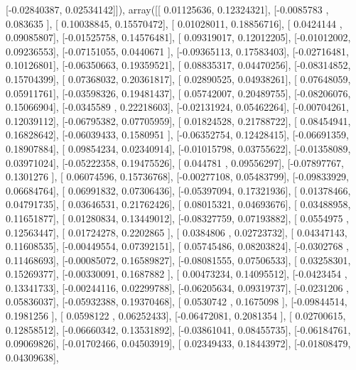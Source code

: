 \documentclass{article}
\begin{document}
       [-0.02840387,  0.02534142]]), array([[ 0.01125636,  0.12324321],
       [-0.0085783 ,  0.083635  ],
       [ 0.10038845,  0.15570472],
       [ 0.01028011,  0.18856716],
       [ 0.0424144 ,  0.09085807],
       [-0.01525758,  0.14576481],
       [ 0.09319017,  0.12012205],
       [-0.01012002,  0.09236553],
       [-0.07151055,  0.0440671 ],
       [-0.09365113,  0.17583403],
       [-0.02716481,  0.10126801],
       [-0.06350663,  0.19359521],
       [ 0.08835317,  0.04470256],
       [-0.08314852,  0.15704399],
       [ 0.07368032,  0.20361817],
       [ 0.02890525,  0.04938261],
       [ 0.07648059,  0.05911761],
       [-0.03598326,  0.19481437],
       [ 0.05742007,  0.20489755],
       [-0.08206076,  0.15066904],
       [-0.0345589 ,  0.22218603],
       [-0.02131924,  0.05462264],
       [-0.00704261,  0.12039112],
       [-0.06795382,  0.07705959],
       [ 0.01824528,  0.21788722],
       [ 0.08454941,  0.16828642],
       [-0.06039433,  0.1580951 ],
       [-0.06352754,  0.12428415],
       [-0.06691359,  0.18907884],
       [ 0.09854234,  0.02340914],
       [-0.01015798,  0.03755622],
       [-0.01358089,  0.03971024],
       [-0.05222358,  0.19475526],
       [ 0.044781  ,  0.09556297],
       [-0.07897767,  0.1301276 ],
       [ 0.06074596,  0.15736768],
       [-0.00277108,  0.05483799],
       [-0.09833929,  0.06684764],
       [ 0.06991832,  0.07306436],
       [-0.05397094,  0.17321936],
       [ 0.01378466,  0.04791735],
       [ 0.03646531,  0.21762426],
       [ 0.08015321,  0.04693676],
       [ 0.03488958,  0.11651877],
       [ 0.01280834,  0.13449012],
       [-0.08327759,  0.07193882],
       [ 0.0554975 ,  0.12563447],
       [ 0.01724278,  0.2202865 ],
       [ 0.0384806 ,  0.02723732],
       [ 0.04347143,  0.11608535],
       [-0.00449554,  0.07392151],
       [ 0.05745486,  0.08203824],
       [-0.0302768 ,  0.11468693],
       [-0.00085072,  0.16589827],
       [-0.08081555,  0.07506533],
       [ 0.03258301,  0.15269377],
       [-0.00330091,  0.1687882 ],
       [ 0.00473234,  0.14095512],
       [-0.0423454 ,  0.13341733],
       [-0.00244116,  0.02299788],
       [-0.06205634,  0.09319737],
       [-0.0231206 ,  0.05836037],
       [-0.05932388,  0.19370468],
       [ 0.0530742 ,  0.1675098 ],
       [-0.09844514,  0.1981256 ],
       [ 0.0598122 ,  0.06252433],
       [-0.06472081,  0.2081354 ],
       [ 0.02700615,  0.12858512],
       [-0.06660342,  0.13531892],
       [-0.03861041,  0.08455735],
       [-0.06184761,  0.09069826],
       [-0.01702466,  0.04503919],
       [ 0.02349433,  0.18443972],
       [-0.01808479,  0.04309638],
\end{document}

